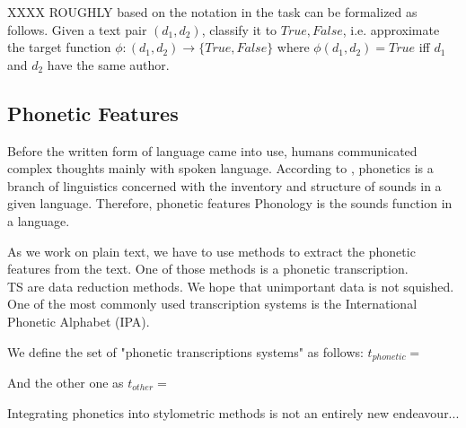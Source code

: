 XXXX ROUGHLY based on the notation in \cite{bevendorff2020shared} the task can be formalized as follows. Given a text pair $(d_1, d_2)$, classify it to ${True, False}$, i.e. approximate the target function $\phi{}:(d_1, d_2)\to\{True, False\}$ where $\phi(d_1, d_2)=True$ iff $d_1$ and $d_2$ have the same author.

\subsection{Phonetic Features}
Before the written form of language came into use, humans communicated complex thoughts mainly with spoken language.
According to \cite{ogrady2017introToLinguistics}, phonetics is a branch of linguistics concerned with the inventory and structure of sounds in a given language. Therefore, phonetic features
Phonology is the sounds function in a language.






As we work on plain text, we have to use methods to extract the phonetic features from the text. One of those methods is a phonetic transcription.\\
TS are data reduction methods. We hope that unimportant data is not squished.
One of the most commonly used transcription systems is the International Phonetic Alphabet (IPA).

We define the set of "phonetic transcriptions systems" as follows:
$t_{phonetic} = {}$

And the other one as $t_{other} = {}$





Integrating phonetics into stylometric methods is not an entirely new endeavour...